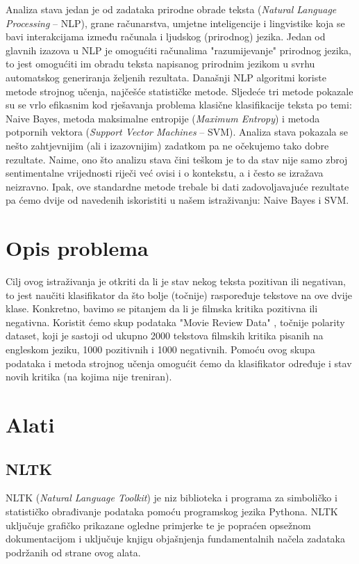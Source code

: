 \documentclass[conference]{IEEEtran}
\begin{document}
Analiza stava jedan je od zadataka prirodne obrade teksta (\textit{Natural Language Processing} -- NLP), grane računarstva, umjetne inteligencije i lingvistike koja se bavi interakcijama između računala i ljudskog (prirodnog) jezika. Jedan od glavnih izazova u NLP je omogućiti računalima "razumijevanje" prirodnog jezika, to jest omogućiti im obradu teksta napisanog prirodnim jezikom u svrhu automatskog generiranja željenih rezultata. Današnji NLP algoritmi koriste metode strojnog učenja, najčešće statističke metode. Sljedeće tri metode pokazale su se vrlo efikasnim kod rješavanja problema klasične klasifikacije teksta po temi: Naive Bayes, metoda maksimalne entropije (\textit{Maximum Entropy}) i metoda potpornih vektora (\textit{Support Vector Machines} -- SVM). Analiza stava pokazala se nešto zahtjevnijim (ali i izazovnijim) zadatkom pa ne očekujemo tako dobre rezultate. Naime, ono što analizu stava čini teškom je to da stav nije samo zbroj sentimentalne vrijednosti riječi već ovisi i o kontekstu, a i često se izražava neizravno. Ipak, ove standardne metode trebale bi dati zadovoljavajuće rezultate pa ćemo dvije od navedenih iskoristiti u našem istraživanju: Naive Bayes i SVM.

\section{Opis problema}

Cilj ovog istraživanja je otkriti da li je stav nekog teksta pozitivan ili negativan, to jest naučiti klasifikator da što bolje (točnije) raspoređuje tekstove na ove dvije klase. Konkretno, bavimo se pitanjem da li je filmska kritika pozitivna ili negativna. Koristit ćemo skup podataka "Movie Review Data" \cite{dataset}, točnije polarity dataset, koji je sastoji od ukupno 2000 tekstova filmskih kritika pisanih na engleskom jeziku, 1000 pozitivnih i 1000 negativnih. Pomoću ovog skupa podataka i metoda strojnog učenja omogućit ćemo da klasifikator određuje i stav novih kritika (na kojima nije treniran).

\section{Alati}

\subsection{NLTK}

NLTK (\textit{Natural Language Toolkit}) je niz biblioteka i programa za simboličko i statističko obrađivanje podataka pomoću programskog jezika Pythona. NLTK uključuje grafičko prikazane ogledne primjerke te je popraćen opsežnom dokumentacijom i uključuje knjigu \cite{nltk} objašnjenja fundamentalnih načela zadataka podržanih od strane ovog alata.
\end{document}
